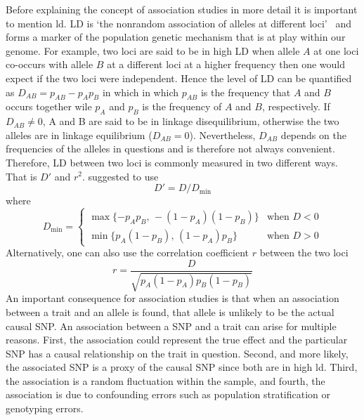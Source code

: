 Before explaining the concept of association studies in more detail it is important to mention \acrfull{ld}.
LD is `the nonrandom association of alleles at different loci'~\cite{Slatkin2008} and forms a marker of the population genetic mechanism that is at play within our genome.
For example, two loci are said to be in high LD when allele $A$ at one loci co-occurs with allele $B$ at a different loci at a higher frequency then one would expect if the two loci were independent.
Hence the level of LD can be quantified as $D_{AB}=p_{AB} - p_{A}p_{B}$ in which in which $p_{AB}$ is the frequency that $A$ and $B$ occurs together wile $p_A$ and $p_B$ is the frequency of $A$ and $B$, respectively.
If $D_{AB} \neq 0$, A and B are said to be in linkage disequilibrium, otherwise the two alleles are in linkage equilibrium ($D_{AB}=0$).
Nevertheless, $D_{AB}$ depends on the frequencies of the alleles in questions and is therefore not always convenient.
Therefore, LD between two loci is commonly measured in two different ways. 
That is $D'$ and $r^2$.
\citet{Lewontin1964} suggested to use
\begin{equation}\label{eq:dprime}
  D' = D/D_{\min}
\end{equation}
where 
\begin{equation*}
  D_{\min}= \begin{cases}
    \max\{-p_A p_B,\,-(1-p_A)(1-p_B)\} & \text{when } D < 0\\
    \min\{p_A (1-p_B),\,(1-p_A) p_B\} & \text{when } D > 0
  \end{cases} 
\end{equation*}
Alternatively, one can also use the correlation coefficient $r$ between the two loci 
\begin{equation}\label{eq:r2}
  r=\frac{D}{\sqrt{p_A(1-p_A)p_B (1-p_B)}}
\end{equation}
An important consequence for association studies is that when an association between a trait and an allele is found, that allele is unlikely to be the actual causal SNP\@.
An association between a SNP and a trait can arise for multiple reasons.
First, the association could represent the true effect and the particular SNP has a causal relationship on the trait in question.
Second, and more likely, the associated SNP is a proxy of the causal SNP since both are in high \acrshort{ld}.
Third, the association is a random fluctuation within the sample, and 
fourth, the association is due to confounding errors such as population stratification or genotyping errors.

